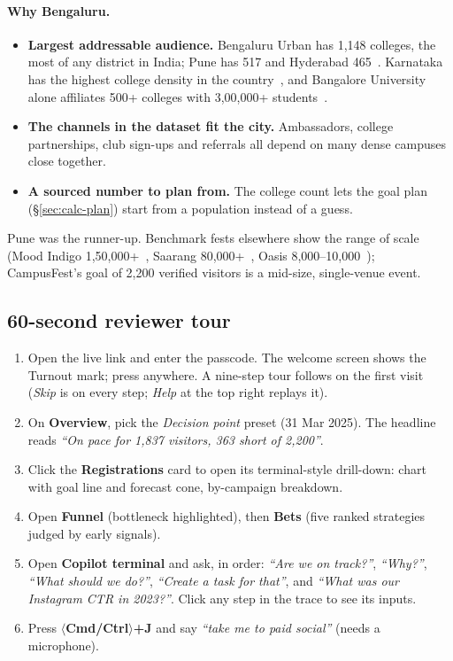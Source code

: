 \documentclass[11pt,a4paper]{article}
\begin{document}
\paragraph{Why Bengaluru.}
\begin{itemize}
  \item \textbf{Largest addressable audience.} Bengaluru Urban has 1,148 colleges, the most of any district in India; Pune has 517 and Hyderabad 465~\cite{aishe2024}. Karnataka has the highest college density in the country~\cite{deccanherald2024}, and Bangalore University alone affiliates 500+ colleges with 3,00,000+ students~\cite{wikiBangaloreEdu}.
  \item \textbf{The channels in the dataset fit the city.} Ambassadors, college partnerships, club sign-ups and referrals all depend on many dense campuses close together.
  \item \textbf{A sourced number to plan from.} The college count lets the goal plan (\S\ref{sec:calc-plan}) start from a population instead of a guess.
\end{itemize}
Pune was the runner-up. Benchmark fests elsewhere show the range of scale (Mood Indigo 1,50,000+~\cite{wikiMoodIndigo}, Saarang 80,000+~\cite{iitmSaarang}, Oasis 8,000--10,000~\cite{wikiOasis}); CampusFest's goal of 2,200 verified visitors is a mid-size, single-venue event.

\subsection{60-second reviewer tour}
\begin{enumerate}
  \item Open the live link and enter the passcode. The welcome screen shows the Turnout mark; press anywhere. A nine-step tour follows on the first visit (\emph{Skip} is on every step; \emph{Help} at the top right replays it).
  \item On \textbf{Overview}, pick the \emph{Decision point} preset (31 Mar 2025). The headline reads \emph{``On pace for 1,837 visitors, 363 short of 2,200''}.
  \item Click the \textbf{Registrations} card to open its terminal-style drill-down: chart with goal line and forecast cone, by-campaign breakdown.
  \item Open \textbf{Funnel} (bottleneck highlighted), then \textbf{Bets} (five ranked strategies judged by early signals).
  \item Open \textbf{Copilot terminal} and ask, in order: \emph{``Are we on track?''}, \emph{``Why?''}, \emph{``What should we do?''}, \emph{``Create a task for that''}, and \emph{``What was our Instagram CTR in 2023?''}. Click any step in the trace to see its inputs.
  \item Press \textbf{$\langle$Cmd/Ctrl$\rangle$+J} and say \emph{``take me to paid social''} (needs a microphone).
\end{enumerate}
\end{document}
